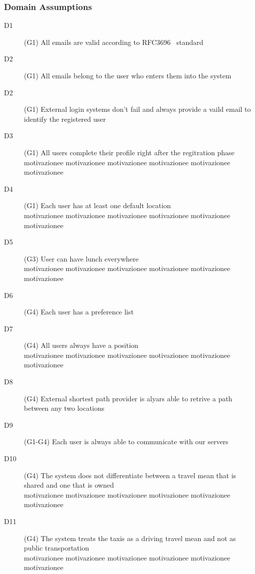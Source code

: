 \subsubsection{Domain Assumptions}

\begin{description}
\item[D1] (G1) All emails are valid according to RFC3696~\cite{RFC3696} standard
\item[D2] (G1) All emails belong to the user who enters them into the system
\item[D2] (G1) External login systems don’t fail and always provide a vaild email to identify the registered user
\item[D3] (G1) All users complete their profile right after the regitration phase \\ [0.1cm]
motivazionee motivazionee motivazionee motivazionee motivazionee motivazionee
\item[D4] (G1) Each user has at least one default location \\ [0.1cm]
motivazionee motivazionee motivazionee motivazionee motivazionee motivazionee
\item[D5] (G3) User can have lunch everywhere \\ [0.1cm]
motivazionee motivazionee motivazionee motivazionee motivazionee motivazionee
\item[D6] (G4) Each user has a preference list
\item[D7] (G4) All users always have a position \\ [0.1cm]
motivazionee motivazionee motivazionee motivazionee motivazionee motivazionee
\item[D8] (G4) External shortest path provider is alyars able to retrive a path between any two locations
\item[D9] (G1-G4) Each user is always able to communicate with our servers
\item[D10] (G4) The system does not differentiate between a travel mean that is shared and one that is owned \\ [0.1cm]
\small{motivazionee motivazionee motivazionee motivazionee motivazionee motivazionee}
\item[D11] (G4) The system treats the taxis as a driving travel mean and not as public transportation \\ [0.1cm]
motivazionee motivazionee motivazionee motivazionee motivazionee motivazionee
\end{description}